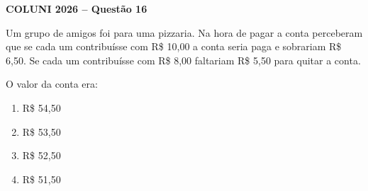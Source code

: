 \textbf{COLUNI 2026 -- Questão 16}\par\medskip Um grupo de amigos foi para uma pizzaria. Na hora de pagar a conta perceberam que se cada um contribuísse com R\$ 10,00 a conta seria paga e sobrariam R\$ 6,50. Se cada um contribuísse com R\$ 8,00 faltariam R\$ 5,50 para quitar a conta.

O valor da conta era:
\begin{enumerate}
\item R\$ 54,50
\item R\$ 53,50
\item R\$ 52,50
\item R\$ 51,50
\end{enumerate}
